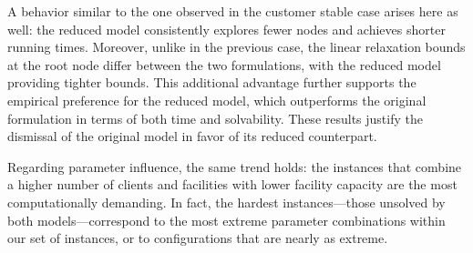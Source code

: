 \documentclass[preprint,11pt,authoryear]{elsarticle}
\begin{document}
A behavior similar to the one observed in the customer stable case arises here as well: the reduced model consistently explores fewer nodes and achieves shorter running times. Moreover, unlike in the previous case, the linear relaxation bounds at the root node differ between the two formulations, with the reduced model providing tighter bounds. This additional advantage further supports the empirical preference for the reduced model, which outperforms the original formulation in terms of both time and solvability. These results justify the dismissal of the original model in favor of its reduced counterpart. 

Regarding parameter influence, the same trend holds: the instances that combine a higher number of clients and facilities with lower facility capacity are the most computationally demanding. In fact, the hardest instances—those unsolved by both models—correspond to the most extreme parameter combinations within our set of instances, or to configurations that are nearly as extreme.
\end{document}
